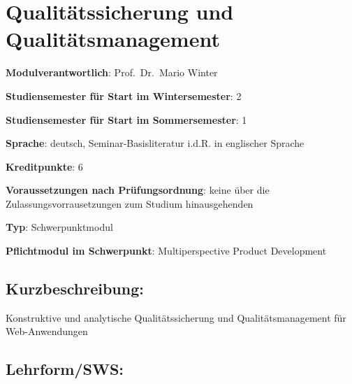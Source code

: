 \chapter{Qualitätssicherung und
Qualitätsmanagement\label{/mi-2017/modulbeschreibungen-master/MA_WTW_Modul_QUS_Winter}}\label{qualituxe4tssicherung-und-qualituxe4tsmanagementpathlabelmi-2017modulbeschreibungen-mastermaux5fwtwux5fmodulux5fqusux5fwinter}

\begin{modulHead}
\textbf{Modulverantwortlich}: Prof.~Dr.~Mario
Winter
\end{modulHead}
\begin{modulHead}
\textbf{Studiensemester für
Start im Wintersemester}:
2
\end{modulHead}
\begin{modulHead}
\textbf{Studiensemester für Start
im Sommersemester}:
1
\end{modulHead}
\begin{modulHead}
\textbf{Sprache}: deutsch,
Seminar-Basisliteratur i.d.R. in englischer
Sprache
\end{modulHead}
\begin{modulHead}
\textbf{Kreditpunkte}:
6
\end{modulHead}
\begin{modulHead}
\textbf{Voraussetzungen nach
Prüfungsordnung}: keine über die Zulassungsvorrausetzungen zum Studium
hinausgehenden
\end{modulHead}
\begin{modulHead}
\textbf{Typ}:
Schwerpunktmodul
\end{modulHead}
\begin{modulHead}
\textbf{Pflichtmodul
im Schwerpunkt}: Multiperspective Product Development
\end{modulHead}


\section*{Kurzbeschreibung:\label{/mi-2017/modulbeschreibungen-master/MA_WTW_Modul_QUS_Winter}}\label{kurzbeschreibungpathlabelmi-2017modulbeschreibungen-mastermaux5fwtwux5fmodulux5fqusux5fwinter}

Konstruktive und analytische Qualitätssicherung und Qualitätsmanagement
für Web-Anwendungen

\section*{Lehrform/SWS:\label{/mi-2017/modulbeschreibungen-master/MA_WTW_Modul_QUS_Winter}}\label{lehrformswspathlabelmi-2017modulbeschreibungen-mastermaux5fwtwux5fmodulux5fqusux5fwinter}

